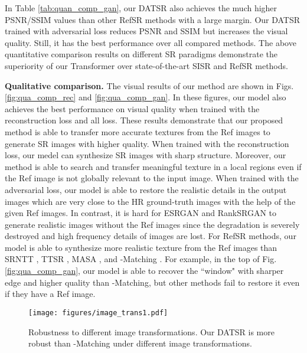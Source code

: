 \documentclass[runningheads]{llncs}
\begin{document}
In Table \ref{tab:quan_comp_gan}, our DATSR also achieves the much higher PSNR/SSIM values than other RefSR methods with a large margin.
Our DATSR trained with adversarial loss reduces PSNR and SSIM but increases the visual quality. Still, it has the best performance over all compared methods.
The above quantitative comparison results on different SR paradigms demonstrate the superiority of our Transformer over state-of-the-art SISR and RefSR methods.


\noindent\textbf{Qualitative comparison.}
The visual results of our method are shown in Figs. \ref{fig:qua_comp_rec} and \ref{fig:qua_comp_gan}.
In these figures, our model also achieves the best performance on visual quality when trained with the reconstruction loss and all loss.
These results demonstrate that our proposed method is able to transfer more accurate textures from the Ref images to generate SR images with higher quality.
When trained with the reconstruction loss, our medel can synthesize SR images with sharp structure.
Moreover, our method is able to search and transfer meaningful texture in a local regions even if the Ref image is not globally relevant to the input image.
When trained with the adversarial loss, our model is able to restore the realistic details in the output images which are very close to the HR ground-truth images with the help of the given Ref images.
In contrast, it is hard for ESRGAN and RankSRGAN to generate realistic images without the Ref images since the degradation is severely destroyed and high frequency details of images are lost.
For RefSR methods, our model is able to synthesize more realistic texture from the Ref images than SRNTT \cite{zhang2019image}, TTSR \cite{yang2020learning}, MASA \cite{lu2021masa}, and -Matching \cite{jiang2021robust}.
For example, in the top of Fig. \ref{fig:qua_comp_gan}, our model is able to recover the ``window" with sharper edge and higher quality than -Matching, but other methods fail to restore it even if they have a Ref image. 


\begin{figure*}[!t]
    \setlength\belowcaptionskip{-5pt}
    \setlength\abovecaptionskip{-1pt}
\texttt{[image: figures/image\_trans1.pdf]}
	\caption{Robustness to different image transformations. Our DATSR is more robust than -Matching \cite{jiang2021robust} under different image transformations.}
	\label{fig:image_trans}
\end{figure*}
\end{document}
